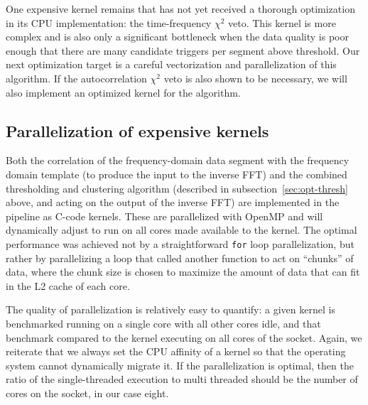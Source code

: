 One expensive kernel remains that has not yet received a thorough optimization
in its CPU implementation: the time-frequency $\chi^2$ veto.  This kernel is more complex and
is also only a significant bottleneck when the data quality is poor enough that
there are many candidate triggers per segment above threshold. %
Our next
optimization target is a careful vectorization and parallelization of this
algorithm. %
If the
autocorrelation $\chi^2$ veto is also
shown to be necessary, we
will also implement an optimized kernel for the algorithm. 

\vspace*{-10pt}
\subsection{Parallelization of expensive kernels}
\vspace*{-05pt}
\label{sec:parall-expens-kern}

Both the correlation of the frequency-domain data segment with the frequency
domain template (to produce the input to the inverse FFT) and the combined
thresholding and clustering algorithm (described in
subsection~\ref{sec:opt-thresh} above, and acting on the output of the inverse
FFT) are implemented in the pipeline as C-code kernels.  These are parallelized
with OpenMP and will dynamically adjust to run on all cores made available to
the kernel. The optimal performance was achieved not by a straightforward
\texttt{for} loop parallelization, but rather by parallelizing a loop that
called another function to act on ``chunks'' of data, where the chunk size is
chosen to maximize the amount of data that can fit in the L2 cache of each
core.

The quality of parallelization is relatively easy to quantify: a given kernel is
benchmarked running on a single core with all other cores idle, and that
benchmark compared to the kernel executing on all cores of the socket. Again, we
reiterate that we always set the CPU affinity of a kernel so that the operating
system cannot dynamically migrate it. If the parallelization is optimal, then
the ratio of the single-threaded execution to multi threaded should be the number
of cores on the socket, in our case eight.

